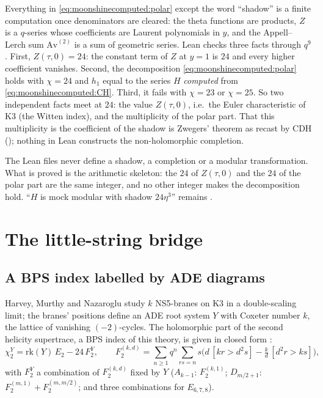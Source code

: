 Everything in \eqref{eq:moonshinecomputed:polar} except the word ``shadow'' is a finite
computation once denominators are cleared: the theta functions are products, $Z$ is a
$q$-series whose coefficients are Laurent polynomials in $y$, and the Appell--Lerch sum
$\mathrm{Av}^{(2)}$ is a sum of geometric series. Lean checks three facts through $q^9$.
First, $Z(\tau,0)=24$: the constant term of $Z$ at $y=1$ is $24$ and every higher
coefficient vanishes. Second, the decomposition \eqref{eq:moonshinecomputed:polar} holds
with $\chi=24$ and $h_1$ equal to the series $H$ \emph{computed} from
\eqref{eq:moonshinecomputed:CH}. Third, it fails with $\chi=23$ or $\chi=25$. So two
independent facts meet at $24$: the value $Z(\tau,0)$, i.e.\ the Euler characteristic
of K3 (the Witten index), and the multiplicity of the polar part. That this multiplicity is
the coefficient of the shadow is Zwegers' theorem as recast by CDH (\TL); nothing in Lean
constructs the non-holomorphic completion.

\begin{pitfallbox}
The Lean files never define a shadow, a completion or a modular transformation. What is
proved is the arithmetic skeleton: the $24$ of $Z(\tau,0)$ and the $24$ of the polar part
are the same integer, and no other integer makes the decomposition hold. ``$H$ is mock
modular with shadow $24\eta^3$'' remains \TL.
\end{pitfallbox}

\section{The little-string bridge}\label{sec:moonshinecomputed:hmn}

\subsection{A BPS index labelled by ADE diagrams}

Harvey, Murthy and Nazaroglu study $k$ NS5-branes on K3 in a double-scaling limit; the
branes' positions define an ADE root system $Y$ with Coxeter number $k$, the lattice of
vanishing $(-2)$-cycles. The holomorphic part of the second
helicity supertrace, a BPS index of this theory, is given in closed form
:
\begin{equation}\label{eq:moonshinecomputed:chi2Y}
  \chi_2^Y=\mathrm{rk}(Y)\,E_2-24\,F_2^Y,\qquad
  F_2^{(k,d)}=\sum_{n\ge1}q^n\sum_{rs=n}s\bigl(d\,[kr>d^2s]-\tfrac kd\,[d^2r>ks]\bigr),
\end{equation}
with $F_2^Y$ a combination of $F_2^{(k,d)}$ fixed by $Y$ ($A_{k-1}$: $F_2^{(k,1)}$;
$D_{m/2+1}$: $F_2^{(m,1)}+F_2^{(m,m/2)}$; and three combinations for $E_{6,7,8}$).

